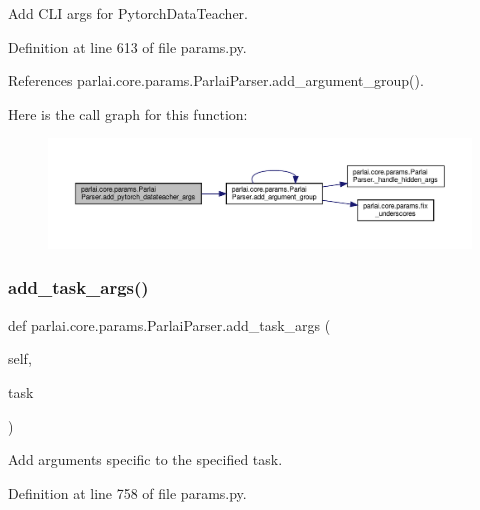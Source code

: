 \begin{DoxyVerb}Add CLI args for PytorchDataTeacher.\end{DoxyVerb}
 

Definition at line 613 of file params.\+py.



References parlai.\+core.\+params.\+Parlai\+Parser.\+add\+\_\+argument\+\_\+group().

Here is the call graph for this function\+:
\nopagebreak
\begin{figure}[H]
\begin{center}
\leavevmode
\includegraphics[width=350pt]{classparlai_1_1core_1_1params_1_1ParlaiParser_a037989eca768126b981270b2bdf06b0c_cgraph}
\end{center}
\end{figure}
\mbox{\label{classparlai_1_1core_1_1params_1_1ParlaiParser_a61ff766a70bd11365cbcbf71431ce527}} 
\subsubsection{\texorpdfstring{add\+\_\+task\+\_\+args()}{add\_task\_args()}}
{\footnotesize\ttfamily def parlai.\+core.\+params.\+Parlai\+Parser.\+add\+\_\+task\+\_\+args (\begin{DoxyParamCaption}\item[{}]{self,  }\item[{}]{task }\end{DoxyParamCaption})}

\begin{DoxyVerb}Add arguments specific to the specified task.\end{DoxyVerb}
 

Definition at line 758 of file params.\+py.



